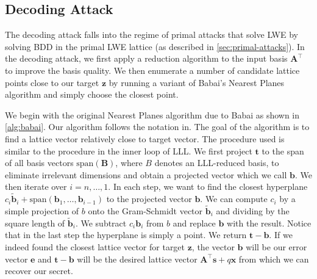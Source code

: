 \subsection[Decoding Attack]{Decoding Attack \cite{LP11}} \label{sec:decoding}

The decoding attack falls into the regime of primal attacks that solve LWE by solving BDD in the primal LWE lattice (as described in \cref{sec:primal-attacks}). In the decoding attack, we first apply a reduction algorithm to the input basis $\mathbf{A}^\intercal$ to improve the basis quality. We then enumerate a number of candidate lattice points close to our target $\mathbf{z}$ by running a variant of Babai's Nearest Planes algorithm and simply choose the closest point. %







We begin with the original Nearest Planes algorithm due to Babai \cite{Bab85} as shown in \cref{alg:babai}. Our algorithm follows the notation in\cite{NPReg04}. The goal of the algorithm is to find a lattice vector relatively close to target vector. The procedure used is similar to the procedure in the inner loop of LLL. We first project $\mathbf{t}$ to the span of all basis vectors $\text{span}(\mathbf{B})$, where $B$ denotes an LLL-reduced basis, to eliminate irrelevant dimensions and obtain a projected vector which we call $\mathbf{b}$. We then iterate over $i=n, \ldots, 1$. In each step, we want to find the closest hyperplane $c_i \tilde{\mathbf{b}}_i + \text{span}(\mathbf{b}_1, \dots, \mathbf{b}_{i-1})$ to the projected vector $\mathbf{b}$. We can compute $c_i$ by a simple projection of $b$ onto the Gram-Schmidt vector $\tilde{\mathbf{b}}_i$ and dividing by the square length of $\tilde{\mathbf{b}}_i$. We subtract $c_i \mathbf{b}_i$ from $b$ and replace $\mathbf{b}$ with the result. Notice that in the last step the hyperplane is simply a point. We return $\mathbf{t} - \mathbf{b}$. If we indeed found the closest lattice vector for target $\mathbf{z}$, the vector $\mathbf{b}$ will be our error vector $\mathbf{e}$ and $\mathbf{t} - \mathbf{b}$ will be the desired lattice vector  $\mathbf{A}^\intercal \mathbf{s} + q \mathbf{x}$ from which we can recover our secret.

